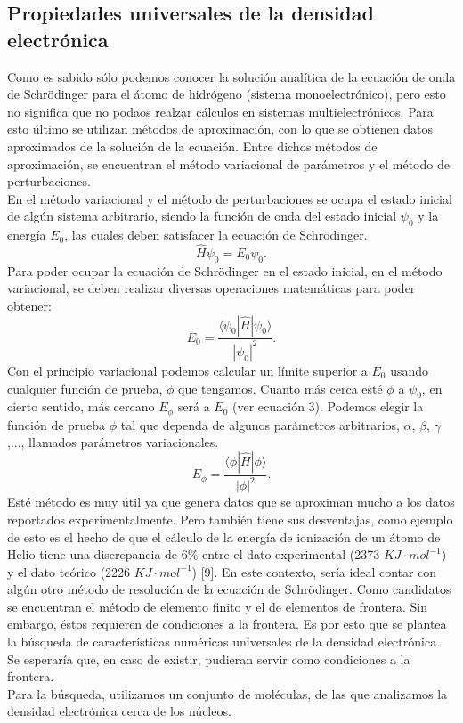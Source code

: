 \documentclass[12pt,letterpaper]{article}
\begin{document}
\subsection{Propiedades universales de la densidad electrónica}
Como es sabido sólo podemos conocer la solución analítica de la ecuación de onda de Schrödinger para el átomo de hidrógeno (sistema monoelectrónico),  pero esto no significa que no podaos realzar cálculos en sistemas multielectrónicos. Para esto último se utilizan métodos de aproximación, con lo que se obtienen datos aproximados de la solución de la ecuación. Entre dichos métodos de aproximación, se encuentran el método variacional de parámetros y el método de perturbaciones.\\
En el método variacional y el método de perturbaciones se ocupa el estado inicial de algún sistema arbitrario, siendo la función de onda del estado inicial $\psi_{0}$ y la energía $E_{0}$, las cuales deben satisfacer la ecuación de Schrödinger.\\
\begin{equation}
 \hat{H}\psi_{0}=E_{0}\psi_{0}.
\end{equation}
Para poder ocupar la ecuación de Schrödinger en el estado inicial, en el método variacional, se deben realizar diversas operaciones matemáticas para poder obtener:
 \begin{equation}
  E_{0}=\frac{\langle \psi_{0}|\hat{H}|\psi_{0} \rangle}{|\psi_{0}|^{2}}.
 \end{equation}
Con el principio variacional podemos calcular un límite superior a $E_{0}$ usando cualquier función de prueba, $\phi$ que tengamos. Cuanto más cerca esté $\phi$ a $\psi_{0}$, en cierto sentido, más cercano $E_{\phi}$ será a $E_{0}$ (ver ecuación 3). Podemos elegir la función de prueba $\phi$ tal que dependa de algunos parámetros arbitrarios, $\alpha$, $\beta$, $\gamma$,..., llamados parámetros variacionales.\\
\begin{equation}
 E_{\phi}=\frac{\langle\phi|\hat{H}|\phi\rangle}{|\phi|^{2}}.
\end{equation}
Esté método es muy útil ya que genera datos que se aproximan mucho a los datos reportados experimentalmente. Pero también tiene sus desventajas, como ejemplo de esto es el hecho de que el cálculo de la energía de ionización de un átomo de Helio tiene una discrepancia de 6\% entre el dato experimental (2373 $KJ\cdot mol^{-1}$) y el dato teórico (2226 $KJ\cdot mol^{-1}$) [9]. En este contexto, sería ideal contar con algún otro método de resolución de la ecuación de Schrödinger. Como candidatos se encuentran el método de elemento finito y el de elementos de frontera. Sin embargo, éstos requieren de condiciones a la frontera. Es por esto que se plantea la búsqueda de características numéricas universales de la densidad electrónica. Se esperaría que, en caso de existir, pudieran servir como condiciones a la frontera.\\
Para la búsqueda, utilizamos un conjunto de moléculas, de las que analizamos la densidad electrónica cerca de los núcleos.
\end{document}
